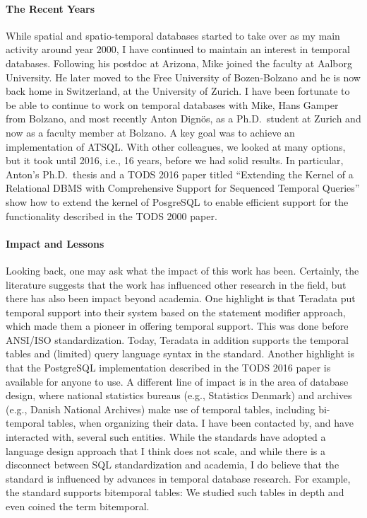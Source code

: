 \documentclass[11pt]{article}
\begin{document}
\paragraph{The Recent Years} While spatial and spatio-temporal databases started to take over as my main activity around year 2000, I have continued to maintain an interest in temporal databases. Following his postdoc at Arizona, Mike joined the faculty at Aalborg University. He later moved to the Free University of Bozen-Bolzano and he is now back home in Switzerland, at the University of Zurich. I have been fortunate to be able to continue to work on temporal databases with Mike, Hans Gamper from Bolzano, and most recently Anton Dign\"{o}s, as a Ph.D.\ student at Zurich and now as a faculty member at Bolzano. A key goal was to achieve an implementation of ATSQL. With other colleagues, we looked at many options, but it took until 2016, i.e., 16 years, before we had solid results. In particular, Anton's Ph.D.\ thesis and a TODS 2016 paper titled ``Extending the Kernel of a Relational DBMS with Comprehensive Support for Sequenced Temporal Queries'' show how to extend the kernel of PosgreSQL to enable efficient support for the functionality described in the TODS 2000 paper.

\paragraph{Impact and Lessons} Looking back, one may ask what the impact of this work has been. Certainly, the literature suggests that the work has influenced other research in the field, but there has also been impact beyond academia. One highlight is that Teradata put temporal support into their system based on the statement modifier approach, which made them a pioneer in offering temporal support. This was done before ANSI/ISO standardization. Today, Teradata in addition supports the temporal tables and (limited) query language syntax in the standard. Another highlight is that the PostgreSQL implementation described in the TODS 2016 paper is available for anyone to use. A different line of impact is in the area of database design, where national statistics bureaus (e.g., Statistics Denmark) and archives (e.g., Danish National Archives) make use of temporal tables, including bi-temporal tables, when organizing their data. I have been contacted by, and have interacted with, several such entities. While the standards have adopted a language design approach that I think does not scale, and while there is a disconnect between SQL standardization and academia, I do believe that the standard is influenced by advances in temporal database research. For example, the standard supports bitemporal tables: We studied such tables in depth and even coined the term bitemporal.
\end{document}
